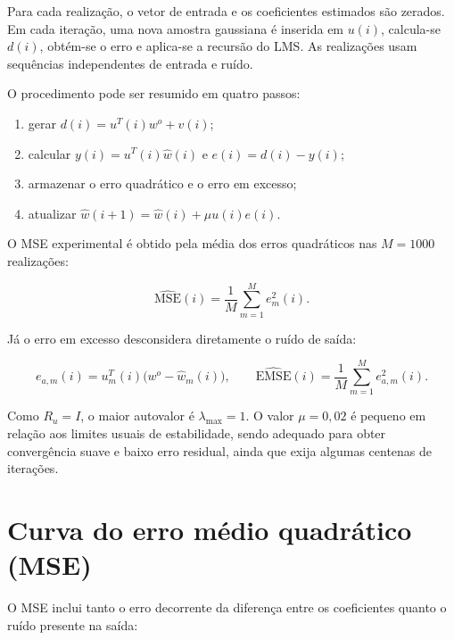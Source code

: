 \documentclass[11pt,a4paper,oneside]{report}
\newcommand{\wtrue}{w^{o}}
\newcommand{\what}{\widehat{w}}
\begin{document}
Para cada realização, o vetor de entrada e os coeficientes estimados são zerados. Em cada iteração,
uma nova amostra gaussiana é inserida em \(u(i)\), calcula-se \(d(i)\), obtém-se o erro e aplica-se
a recursão do LMS. As realizações usam sequências independentes de entrada e ruído.

O procedimento pode ser resumido em quatro passos:

\begin{enumerate}[label=\arabic*.,leftmargin=1.0cm,itemsep=0.25em]
    \item gerar \(d(i)=u^T(i)\wtrue+v(i)\);
    \item calcular \(y(i)=u^T(i)\what(i)\) e \(e(i)=d(i)-y(i)\);
    \item armazenar o erro quadrático e o erro em excesso;
    \item atualizar \(\what(i+1)=\what(i)+\mu u(i)e(i)\).
\end{enumerate}

O MSE experimental é obtido pela média dos erros quadráticos nas \(M=1000\) realizações:

\begin{equation}
    \widehat{\mathrm{MSE}}(i)=\frac{1}{M}\sum_{m=1}^{M}e_m^2(i).
\end{equation}

Já o erro em excesso desconsidera diretamente o ruído de saída:

\begin{equation}
    e_{a,m}(i)=u_m^T(i)\bigl(\wtrue-\what_m(i)\bigr),
    \qquad
    \widehat{\mathrm{EMSE}}(i)=\frac{1}{M}\sum_{m=1}^{M}e_{a,m}^2(i).
\end{equation}

Como \(R_u=I\), o maior autovalor é \(\lambda_{\max}=1\). O valor \(\mu=0{,}02\)
é pequeno em relação aos limites usuais de estabilidade, sendo adequado para obter convergência suave
e baixo erro residual, ainda que exija algumas centenas de iterações.

\clearpage

\section{Curva do erro médio quadrático (MSE)}

O MSE inclui tanto o erro decorrente da diferença entre os coeficientes quanto o ruído presente na saída:
\end{document}
